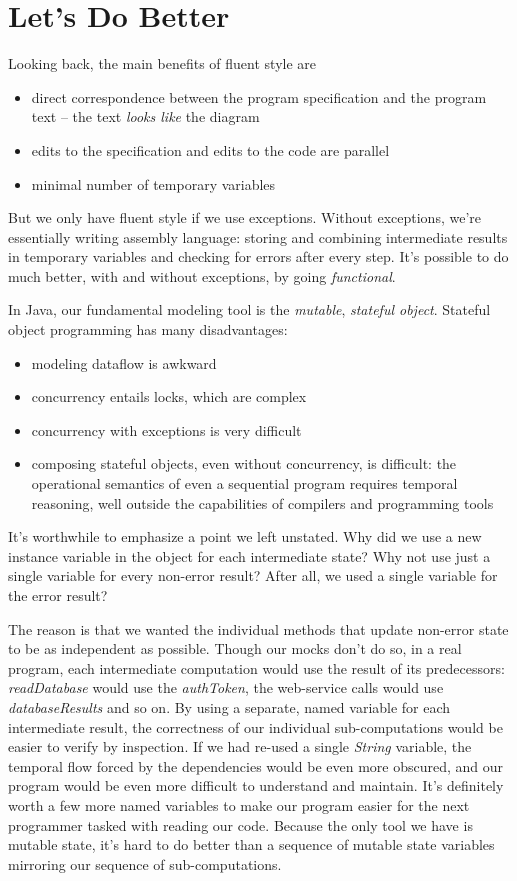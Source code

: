 \documentclass[11pt]{article}
\begin{document}
\section{Let's Do Better}
\label{sec-3}

Looking back, the main benefits of fluent style are
\begin{itemize}
\item direct correspondence between the program specification and the
program text -- the text \emph{looks like} the diagram
\item edits to the specification and edits to the code are parallel
\item minimal number of temporary variables
\end{itemize}

But we only have fluent style if we use exceptions. Without
exceptions, we're essentially writing assembly language: storing and
combining intermediate results in temporary variables and checking
for errors after every step. It's possible to do much better, with
and without exceptions, by going \emph{functional}.

In Java, our fundamental modeling tool is the \emph{mutable}, \emph{stateful
object}. Stateful object programming has many disadvantages:
\begin{itemize}
\item modeling dataflow is awkward
\item concurrency entails locks, which are complex
\item concurrency with exceptions is very difficult
\item composing stateful objects, even without concurrency, is
difficult: the operational semantics of even a sequential program
requires temporal reasoning, well outside the capabilities of
compilers and programming tools
\end{itemize}

It's worthwhile to emphasize a point we left unstated. Why did we
use a new instance variable in the object for each intermediate
state? Why not use just a single variable for every non-error
result? After all, we used a single variable for the error result?

The reason is that we wanted the individual methods that update
non-error state to be as independent as possible. Though our mocks
don't do so, in a real program, each intermediate computation would
use the result of its predecessors: \emph{readDatabase} would use the
\emph{authToken}, the web-service calls would use \emph{databaseResults} and
so on. By using a separate, named variable for each intermediate
result, the correctness of our individual sub-computations would be
easier to verify by inspection. If we had re-used a single \emph{String}
variable, the temporal flow forced by the dependencies would be even
more obscured, and our program would be even more difficult to
understand and maintain. It's definitely worth a few more named
variables to make our program easier for the next programmer tasked
with reading our code. Because the only tool we have is mutable
state, it's hard to do better than a sequence of mutable state
variables mirroring our sequence of sub-computations.
\end{document}
